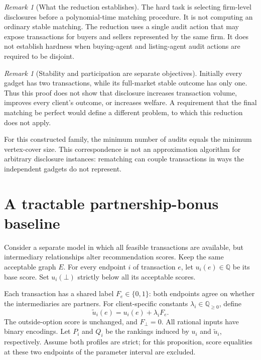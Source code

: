 \documentclass[11pt,letterpaper]{article}
\theoremstyle{definition}
\theoremstyle{remark}
\newtheorem{remark}[theorem]{Remark}
\newcommand{\botv}{\bot}
\begin{document}
\begin{remark}[What the reduction establishes]
The hard task is selecting firm-level disclosures before a polynomial-time
matching procedure. It is not computing an ordinary stable matching. The
reduction uses a single audit action that may expose transactions for buyers
and sellers represented by the same firm. It does not establish hardness when
buying-agent and listing-agent audit actions are required to be disjoint.
\end{remark}

\begin{remark}[Stability and participation are separate objectives]
Initially every gadget has two transactions, while its full-market stable
outcome has only one. Thus this proof does not show that disclosure increases
transaction volume, improves every client's outcome, or increases welfare.
A requirement that the final matching be perfect would define a different
problem, to which this reduction does not apply.
\end{remark}

For this constructed family, the minimum number of audits equals the minimum
vertex-cover size. This correspondence is not an approximation algorithm for
arbitrary disclosure instances: rematching can couple transactions in ways the
independent gadgets do not represent.

\section{A tractable partnership-bonus baseline}

Consider a separate model in which all feasible transactions are available,
but intermediary relationships alter recommendation scores. Keep the same
acceptable graph \(E\). For every endpoint \(i\) of transaction \(e\), let
\(u_i(e)\in\mathbb{Q}\) be its base score. Set \(u_i(\botv)\) strictly below all its
acceptable scores.

Each transaction has a shared label \(F_e\in\{0,1\}\): both endpoints agree on
whether the intermediaries are partners. For client-specific constants
\(\lambda_i\in\mathbb{Q}_{\geq0}\), define
\begin{equation}
\widetilde u_i(e)=u_i(e)+\lambda_iF_e.
\label{eq:bonus}
\end{equation}
The outside-option score is unchanged, and \(F_{\botv}=0\).
All rational inputs have binary encodings.
Let \(P_i\) and \(Q_i\) be the rankings induced by \(u_i\) and
\(\widetilde u_i\), respectively. Assume both profiles are strict; for this
proposition, score equalities at these two endpoints of the parameter interval
are excluded.
\end{document}
